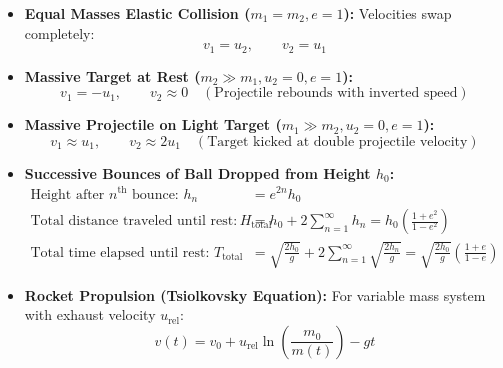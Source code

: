 \documentclass[10pt,a4paper]{article}
\begin{document}
\begin{usecasebox}
\begin{itemize}
  \item \textbf{Equal Masses Elastic Collision ($m_1 = m_2, e = 1$):} Velocities swap completely:
  \begin{equation}
    v_1 = u_2, \qquad v_2 = u_1
  \end{equation}
  \item \textbf{Massive Target at Rest ($m_2 \gg m_1, u_2 = 0, e = 1$):}
  \begin{equation}
    v_1 = -u_1, \qquad v_2 \approx 0 \quad (\text{Projectile rebounds with inverted speed})
  \end{equation}
  \item \textbf{Massive Projectile on Light Target ($m_1 \gg m_2, u_2 = 0, e = 1$):}
  \begin{equation}
    v_1 \approx u_1, \qquad v_2 \approx 2u_1 \quad (\text{Target kicked at double projectile velocity})
  \end{equation}
  \item \textbf{Successive Bounces of Ball Dropped from Height $h_0$:}
  \begin{align}
    \text{Height after } n^{\text{th}}\text{ bounce: } h_n &= e^{2n}h_0 \\
    \text{Total distance traveled until rest: } H_{\text{total}} &= h_0 + 2\sum_{n=1}^\infty h_n = h_0\left(\frac{1+e^2}{1-e^2}\right) \\
    \text{Total time elapsed until rest: } T_{\text{total}} &= \sqrt{\frac{2h_0}{g}} + 2\sum_{n=1}^\infty \sqrt{\frac{2h_n}{g}} = \sqrt{\frac{2h_0}{g}}\left(\frac{1+e}{1-e}\right)
  \end{align}
  \item \textbf{Rocket Propulsion (Tsiolkovsky Equation):} For variable mass system with exhaust velocity $u_{\text{rel}}$:
  \begin{equation}
    v(t) = v_0 + u_{\text{rel}}\ln\left(\frac{m_0}{m(t)}\right) - gt
  \end{equation}
\end{itemize}
\end{usecasebox}
\end{document}
